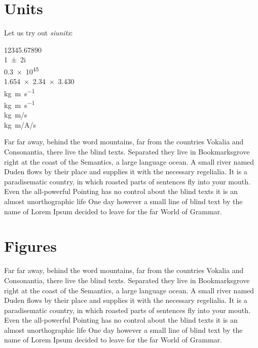 \section{Units}
\label{sec:units}

Let us try out \emph{siunitx}: 

\num{12345,67890} \\
\num{1+-2i} \\
\num{.3e45} \\
\num{1.654 x 2.34 x 3.430}\\
\si{kg.m.s^{-1}} \\
\si{\kilogram\metre\per\second} \\
\si[per-mode=symbol]
{\kilogram\metre\per\second} \\
\si[per-mode=symbol]
{\kilogram\metre\per\ampere\per\second}

Far far away, behind the word mountains, far from the countries Vokalia and
Consonantia, there live the blind texts. Separated they live in
Bookmarksgrove right at the coast of the Semantics, a large language
ocean. A small river named Duden flows by their place and supplies it with
the necessary regelialia. It is a paradisematic country, in which roasted
parts of sentences fly into your mouth. Even the all-powerful Pointing has
no control about the blind texts it is an almost unorthographic life One
day however a small line of blind text by the name of Lorem Ipsum decided
to leave for the far World of Grammar.

\section{Figures}
\label{sec:figures}

Far far away, behind the word mountains, far from the countries Vokalia and
Consonantia, there live the blind texts. Separated they live in
Bookmarksgrove right at the coast of the Semantics, a large language
ocean. A small river named Duden flows by their place and supplies it with
the necessary regelialia. It is a paradisematic country, in which roasted
parts of sentences fly into your mouth. Even the all-powerful Pointing has
no control about the blind texts it is an almost unorthographic life One
day however a small line of blind text by the name of Lorem Ipsum decided
to leave for the far World of Grammar.

